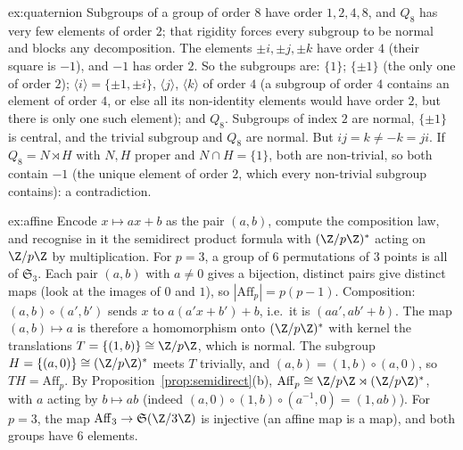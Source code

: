 \begin{solution}{ex:quaternion}
\idea Subgroups of a group of order $8$ have order $1,2,4,8$, and $Q_8$ has very few elements of order $2$; that rigidity forces every subgroup to be normal and blocks any decomposition.
\writeup The elements $\pm i,\pm j,\pm k$ have order $4$ (their square is $-1$), and $-1$ has order $2$. So the subgroups are: $\{1\}$; $\{\pm1\}$ (the only one of order $2$); $\langle i\rangle=\{\pm1,\pm i\}$, $\langle j\rangle$, $\langle k\rangle$ of order $4$ (a subgroup of order $4$ contains an element of order $4$, or else all its non-identity elements would have order $2$, but there is only one such element); and $Q_8$. Subgroups of index $2$ are normal, $\{\pm1\}$ is central, and the trivial subgroup and $Q_8$ are normal. But $ij=k\ne-k=ji$.
If $Q_8=N\rtimes H$ with $N,H$ proper and $N\cap H=\{1\}$, both are non-trivial, so both contain $-1$ (the unique element of order $2$, which every non-trivial subgroup contains): a contradiction.
\end{solution}

\begin{solution}{ex:affine}
\idea Encode $x\mapsto ax+b$ as the pair $(a,b)$, compute the composition law, and recognise in it the semidirect product formula with $(\Z/p\Z)^*$ acting on $\Z/p\Z$ by multiplication. For $p=3$, a group of $6$ permutations of $3$ points is all of $\mathfrak S_3$.
\writeup Each pair $(a,b)$ with $a\ne0$ gives a bijection, distinct pairs give distinct maps (look at the images of $0$ and $1$), so $|\mathrm{Aff}_p|=p(p-1)$. Composition: $(a,b)\circ(a',b')$ sends $x$ to $a(a'x+b')+b$, i.e.\ it is $(aa',ab'+b)$. The map $(a,b)\mapsto a$ is therefore a homomorphism onto $(\Z/p\Z)^*$ with kernel the translations $T=\{(1,b)\}\cong\Z/p\Z$, which is normal. The subgroup $H=\{(a,0)\}\cong(\Z/p\Z)^*$ meets $T$ trivially, and $(a,b)=(1,b)\circ(a,0)$, so $TH=\mathrm{Aff}_p$. By Proposition~\ref{prop:semidirect}(b), $\mathrm{Aff}_p\cong\Z/p\Z\rtimes(\Z/p\Z)^*$, with $a$ acting by $b\mapsto ab$ (indeed $(a,0)\circ(1,b)\circ(a^{-1},0)=(1,ab)$).
For $p=3$, the map $\mathrm{Aff}_3\to\mathfrak S(\Z/3\Z)$ is injective (an affine map is a map), and both groups have $6$ elements.
\end{solution}

